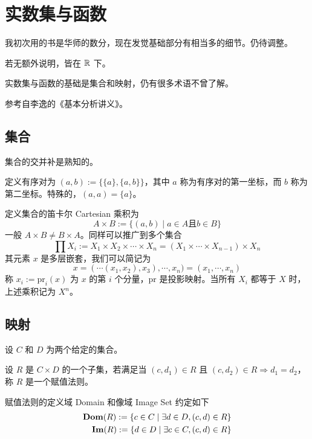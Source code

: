 \chapter{实数集与函数}

我初次用的书是华师的数分，现在发觉基础部分有相当多的细节。仍待调整。

若无额外说明，皆在 $\mathbb{R}$ 下。

实数集与函数的基础是集合和映射，仍有很多术语不曾了解。

参考自李逸的《基本分析讲义》。

\section{集合}

集合的交并补是熟知的。

定义有序对为 $(a,b) := \{\{a\},\{a,b\}\}$，其中 $a$ 称为有序对的第一坐标，而 $b$ 称为第二坐标。特殊的，$(a,a) = \{a\}$。

定义集合的笛卡尔 Cartesian 乘积为
$$A \times B := \{(a,b) \mid a\in A \text{且} b\in B\}$$
一般 $A \times B \ne B \times A$。同样可以推广到多个集合
$$\prod X_i := X_1 \times X_2 \times \cdots \times X_n = (X_1 \times \cdots \times X_{n-1}) \times X_n$$
其元素 $x$ 是多层嵌套，我们可以简记为
$$x = (\cdots(x_1,x_2),x_3),\cdots,x_n) = (x_1,\cdots,x_n)$$
称 $x_i := \mathrm{pr}_i(x)$ 为 $x$ 的第 $i$ 个分量，$\mathrm{pr}$ 是投影映射。当所有 $X_i$ 都等于 $X$ 时，上述乘积记为 $X^n$。

\section{映射}

设 $C$ 和 $D$ 为两个给定的集合。

\begin{definition}[赋值法则]
	设 $R$ 是 $C\times D$ 的一个子集，若满足当 $(c,d_1)\in R$ 且 $(c,d_2)\in R \Rightarrow d_1=d_2$，称 $R$ 是一个赋值法则。
\end{definition}

赋值法则的定义域 Domain 和像域 Image Set 约定如下
\begin{equation*}
	\begin{aligned}
		\operatorname{\mathbf{Dom}}(R) := \{c\in C \mid \exists d \in D, (c,d) \in R\}\\
		\operatorname{\mathbf{Im}}(R) := \{d\in D \mid \exists c \in C, (c,d) \in R\}\\
	\end{aligned}
\end{equation*}

